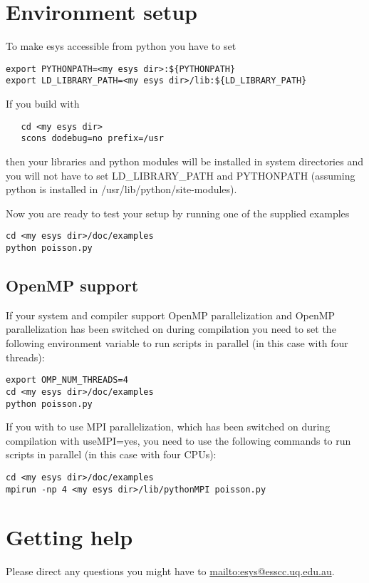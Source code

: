 \section{Environment setup}
To make esys accessible from python you have to set
\begin{verbatim}
export PYTHONPATH=<my esys dir>:${PYTHONPATH}
export LD_LIBRARY_PATH=<my esys dir>/lib:${LD_LIBRARY_PATH}
\end{verbatim}

If you build \esys with
\begin{verbatim}
   cd <my esys dir>
   scons dodebug=no prefix=/usr
\end{verbatim}
then your libraries and python modules will be installed in system directories and you will
not have to set LD_LIBRARY_PATH and PYTHONPATH (assuming python is installed in
/usr/lib/python/site-modules).

Now you are ready to test your setup by running one of the supplied examples
\begin{verbatim}
cd <my esys dir>/doc/examples
python poisson.py
\end{verbatim}

\subsection{OpenMP support}

If your system and compiler support OpenMP parallelization and OpenMP parallelization has been switched on during compilation you need to set the following environment variable to run scripts in parallel (in this case with four threads):
\begin{verbatim}
export OMP_NUM_THREADS=4
cd <my esys dir>/doc/examples
python poisson.py
\end{verbatim}

If you with to use MPI parallelization, which has been switched on during compilation with useMPI=yes, you need to use the following commands to run scripts in parallel (in this case with four CPUs):
\begin{verbatim}
cd <my esys dir>/doc/examples
mpirun -np 4 <my esys dir>/lib/pythonMPI poisson.py
\end{verbatim}

\section{Getting help}
Please direct any questions you might have to \url{mailto:esys@esscc.uq.edu.au}.
